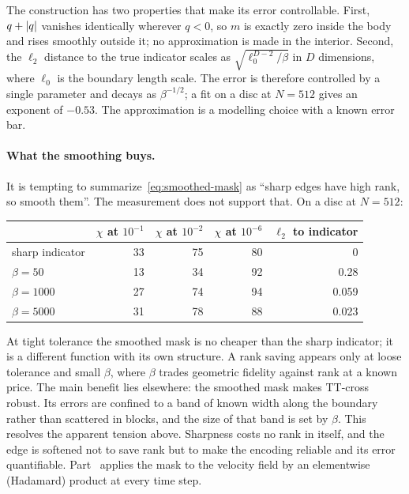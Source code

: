 The construction has two properties that make its error controllable. First,
$q + \left|q\right|$ vanishes identically wherever $q < 0$, so $m$ is exactly zero
inside the body and rises smoothly outside it; no approximation is made in the
interior. Second, the $\ell_2$ distance to the true indicator scales as
$\sqrt{\ell_0^{D-2}/\beta}$ in $D$ dimensions, where $\ell_0$ is the boundary
length scale. The error is therefore controlled by a single parameter and decays
as $\beta^{-1/2}$; a fit on a disc at $N=512$ gives an exponent of $-0.53$. The
approximation is a modelling choice with a known error bar.

\paragraph{What the smoothing buys.}
It is tempting to summarize~\eqref{eq:smoothed-mask} as \enquote{sharp edges
have high rank, so smooth them}. The measurement does not support that. On a
disc at $N=512$:
\begin{center}
  \begin{tabular}{@{}lrrrr@{}}
    \toprule
    & $\chi$ at $10^{-1}$ & $\chi$ at $10^{-2}$ & $\chi$ at $10^{-6}$
      & $\ell_2$ to indicator \\
    \midrule
    sharp indicator  & 33 & 75 & 80 & 0 \\
    $\beta = 50$     & 13 & 34 & 92 & 0.28 \\
    $\beta = 1000$   & 27 & 74 & 94 & 0.059 \\
    $\beta = 5000$   & 31 & 78 & 88 & 0.023 \\
    \bottomrule
  \end{tabular}
\end{center}
At tight tolerance the smoothed mask is no cheaper than the sharp indicator; it
is a different function with its own structure. A rank saving appears only at
loose tolerance and small $\beta$, where $\beta$ trades geometric fidelity
against rank at a known price. The main benefit lies elsewhere: the smoothed mask
makes TT-cross robust. Its errors are confined to a band of known width along the
boundary rather than scattered in blocks, and the size of that band is set by
$\beta$. This resolves the apparent tension above. Sharpness costs no rank in
itself, and the edge is softened not to save rank but to make the encoding
reliable and its error quantifiable. Part~ applies the mask to the
velocity field by an elementwise (Hadamard) product at every time step.


